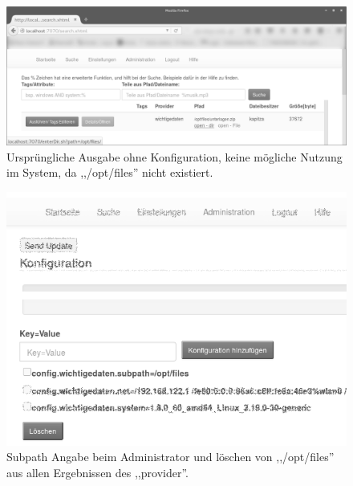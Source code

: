 \documentclass[oneside, ngerman, toc=bibliography,bibliography=totoc,listof=entryprefix, open=right,numbers=noenddot,fontsize=12pt]{scrbook}
\begin{document}
\begin{figure}[htbp] 
    \centering
    \includegraphics[width=\textwidth]{Masterarbeit_Bilder/original_data_example.png}
    \caption{Ursprüngliche Ausgabe ohne Konfiguration, keine mögliche Nutzung im System, da ,,/opt/files'' nicht existiert.}
    \label{fig:www-orig}
\end{figure}  
\begin{figure}[htbp] 
    \centering
    \includegraphics[width=\textwidth]{Masterarbeit_Bilder/admin_remove_sub_cfg.png}
    \caption{Subpath Angabe beim Administrator und löschen von ,,/opt/files'' aus allen Ergebnissen des ,,provider''.}
    \label{fig:www-subpath}
\end{figure}  
\end{document}
